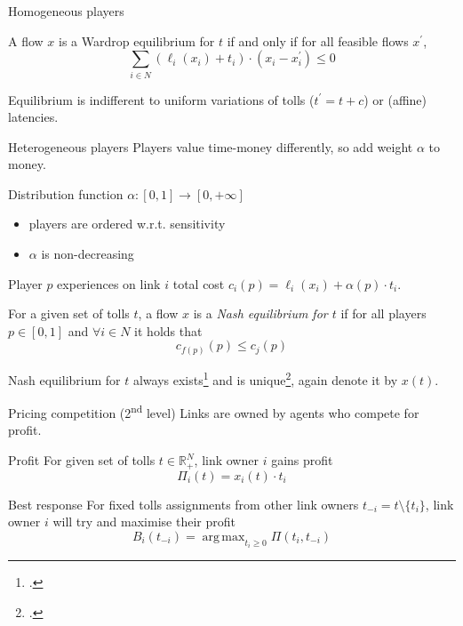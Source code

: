 \documentclass{beamer}
\newcommand{\R}{\mathbb{R}}
\DeclareMathOperator*{\argmax}{arg\,max}
\begin{document}
\begin{frame}{Homogeneous players}
	\begin{lemma}
		A flow $x$ is a Wardrop equilibrium for $t$ if and only if for all feasible flows $x^\prime$,
		\[\sum_{i \in N} (\ell_i(x_i) + t_i) \cdot (x_i - x_i^\prime) \leq 0\]
	\end{lemma}
	Equilibrium is indifferent to uniform variations of tolls ($t^\prime = t + c$) or (affine) latencies.
\end{frame}

\begin{frame}{Heterogeneous players}
	Players value time-money differently, so add weight $\alpha$ to money.
	\begin{block}{Distribution function $\alpha: [0, 1] \rightarrow [0, +\infty]$}
		\begin{itemize}
			\item players are ordered w.r.t. sensitivity
			\item $\alpha$ is non-decreasing
		\end{itemize}
	\end{block}
	Player $p$ experiences on link $i$ total cost $c_i(p) = \ell_i(x_i) + \alpha(p) \cdot t_i$.
	\begin{definition}
		For a given set of tolls $t$, a flow $x$ is a \textit{Nash equilibrium for $t$} if for all players $p \in [0, 1]$ and $\forall i \in N$ it holds that
		\begin{equation*}
			c_{f(p)}(p) \leq c_j(p)
		\end{equation*}
	\end{definition}
\end{frame}

\begin{frame}
	Nash equilibrium for $t$ always exists\footcite{1973JSP.....7..295S} and is unique\footcite{MILCHTAICH1996111}, again denote it by $x(t)$.
\end{frame}

\begin{frame}{Pricing competition (2\textsuperscript{nd} level)}
	Links are owned by agents who compete for profit.
	\begin{block}{Profit}
		For given set of tolls $t \in \R_+^N$, link owner $i$ gains profit
		\[\Pi_i(t) = x_i(t) \cdot t_i\]
	\end{block}

	\begin{block}{Best response}
		For fixed tolls assignments from other link owners $t_{-i} = t \setminus \{t_i\}$, link owner $i$ will try and maximise their profit
		\[B_i(t_{-i}) = \argmax_{t_i \ge 0} \Pi(t_i, t_{-i})\]
	\end{block}
\end{frame}
\end{document}
